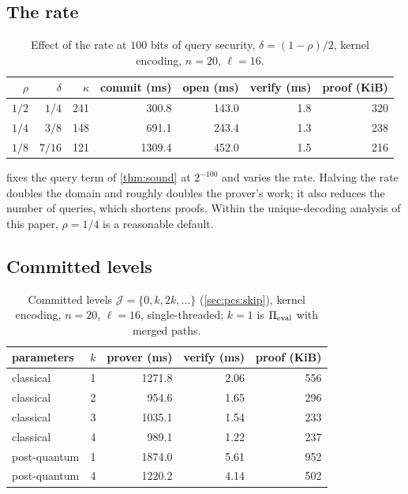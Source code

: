 \subsection{The rate}\label{sec:exp:rate}

\begin{table}[t]
\centering
\small
\begin{tabular}{r r r rrrr}
\toprule
$\rho$ & $\delta$ & $\kappa$ & commit (ms) & open (ms) & verify (ms) & proof (KiB) \\
\midrule
$1/2$ & $1/4$ & 241 & 300.8 & 143.0 & 1.8 & 320 \\
$1/4$ & $3/8$ & 148 & 691.1 & 243.4 & 1.3 & 238 \\
$1/8$ & $7/16$ & 121 & 1309.4 & 452.0 & 1.5 & 216 \\
\bottomrule
\end{tabular}
\caption{Effect of the rate at $100$ bits of query security, $\delta = (1-\rho)/2$, kernel encoding, $n = 20$, $\ell = 16$.}
\label{tab:rate}
\end{table}

 fixes the query term of \cref{thm:sound} at $2^{-100}$ and varies the rate.
Halving the rate doubles the domain and roughly doubles the prover's work; it also reduces the number of queries, which shortens proofs.
Within the unique-decoding analysis of this paper, $\rho = 1/4$ is a reasonable default.

\subsection{Committed levels}\label{sec:exp:arity}

\begin{table}[t]
\centering
\small
\begin{tabular}{l r rrr}
\toprule
parameters & $k$ & prover (ms) & verify (ms) & proof (KiB) \\
\midrule
classical & 1 & 1271.8 & 2.06 & 556 \\
classical & 2 & 954.6 & 1.65 & 296 \\
classical & 3 & 1035.1 & 1.54 & 233 \\
classical & 4 & 989.1 & 1.22 & 237 \\
post-quantum & 1 & 1874.0 & 5.61 & 952 \\
post-quantum & 4 & 1220.2 & 4.14 & 502 \\
\bottomrule
\end{tabular}
\caption{Committed levels $\mathcal{J} = \{0, k, 2k, \dots\}$ (\cref{sec:pcs:skip}), kernel encoding, $n = 20$, $\ell = 16$, single-threaded; $k = 1$ is $\Pi_{\mathrm{eval}}$ with merged paths.}
\label{tab:arity}
\end{table}

